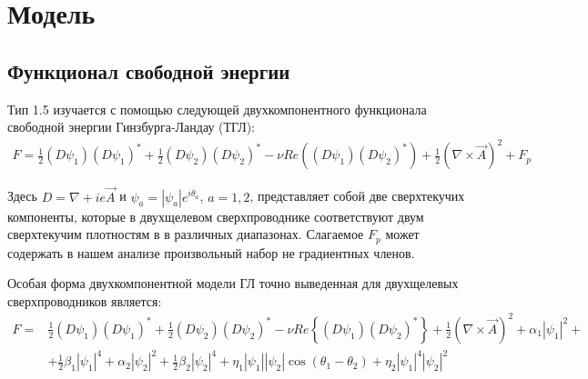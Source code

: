 \chapter{Модель}
\label{ch:2}

\section{Функционал свободной энергии}
\label{sec:2-1}

Тип 1.5 изучается с помощью следующей двухкомпонентного функционала 
свободной энергии Гинзбурга-Ландау (ТГЛ):
\begin{align}
	F = \frac{1}{2}(D\psi_1)(D\psi_1)^* + \frac{1}{2}(D\psi_2)(D\psi_2)^* - 
		\nu Re\left( (D\psi_1)(D\psi_2)^* \right) + 
		\frac{1}{2}\left(\nabla\times\vec{A}\right)^2 + F_p
	\label{eq:1}
\end{align}

Здесь \( D = \nabla + ie\vec{A} \) и \( \psi_a = |\psi_a|e^{i\theta_a} \), 
\( a = 1,2 \), представляет собой две сверхтекучих компоненты, которые в 
двухщелевом сверхпроводнике соответствуют двум сверхтекучим плотностям в 
в различных диапазонах. Слагаемое \( F_p \) может содержать в нашем 
анализе произвольный набор не градиентных членов.

Особая форма двухкомпонентной модели ГЛ точно 
выведенная\cite{bib:8,bib:9,bib:10} для двухщелевых сверхпроводников является:
\begin{align}
	F = & \frac{1}{2}(D\psi_1)(D\psi_1)^* + \frac{1}{2}(D\psi_2)(D\psi_2)^* - 
		\nu Re\left\{ (D\psi_1)(D\psi_2)^* \right\} + 
		\frac{1}{2}\left(\nabla\times\vec{A}\right)^2 + \alpha_1|\psi_1|^2 + 
		\nonumber \\
		& + \frac{1}{2}\beta_1|\psi_1|^4 + \alpha_2|\psi_2|^2 + 
		\frac{1}{2}\beta_2|\psi_2|^4 + \eta_1|\psi_1||\psi_2|
		\cos(\theta_1-\theta_2) + \eta_2|\psi_1|^4|\psi_2|^2
	\label{eq:2}
\end{align}

